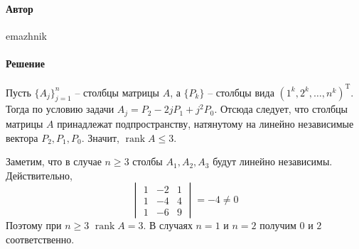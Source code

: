 \documentclass{article}
\DeclareMathOperator{\rank}{rank}
\begin{document}
\paragraph{Автор} emazhnik
\paragraph{Решение} Пусть $\{A_j\}_{j=1}^n$ -- столбцы матрицы $A$, а $\{P_k\}$ -- столбцы вида $(1^k, 2^k, \ldots, n^k)^\mathrm{T}$.
Тогда по условию задачи $A_j = P_2 - 2jP_1 + j^2P_0$. Отсюда следует, что столбцы матрицы $A$ принадлежат подпространству, натянутому на линейно независимые вектора $P_2, P_1, P_0$.
Значит, $\rank A \leq 3$.

Заметим, что в случае  $n\geq 3$ столбы $A_1, A_2, A_3$ будут линейно независимы. Действительно,
$$\begin{vmatrix}
1&-2&1\\
1&-4&4\\
1&-6&9
\end{vmatrix}
= -4 \neq 0$$
Поэтому при $n\geq 3$ $\rank A = 3$. В случаях $n=1$ и $n=2$ получим $0$ и $2$ соответственно.
\end{document}
